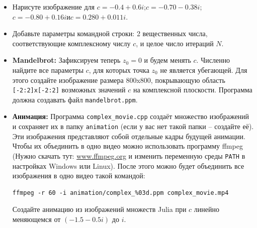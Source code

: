 \documentclass{article}
\begin{document}
\begin{itemize}
\item Нарисуте изображение для $c = -0.4 + 0.6i$;\quad $c = -0.70 - 0.38i$;\quad $c = -0.80 + 0.16i$\quad  и\quad $c = 0.280 + 0.011i$.
\item Добавьте параметры командной строки: 2 вещественных числа, соответствующие комплексному числу $c$, и целое число итераций $N$. 
\item \textbf{Mandelbrot:} Зафиксируем теперь $z_0 = 0$ и будем менять $c$. Численно найдите все параметры $c$, для которых точка $z_0$ не является убегающей. Для этого создайте изображение размера 800x800, покрывающую область \texttt{[-2:2]x[-2:2]} возможных значений $c$ на комплексной плоскости. Программа должна создавать файл \texttt{mandelbrot.ppm}.

\item \textbf{Анимация:} Программа \texttt{complex\_movie.cpp} создаёт множество изображений и сохраняет их в папку \texttt{animation} (если у вас нет такой папки -- создайте её). Эти изображения представляют собой отдельные кадры будущей анимации. Чтобы их объединить в одно видео можно использовать программу ffmpeg (Нужно скачать тут: \href{https://www.ffmpeg.org/}{www.ffmpeg.org} и изменить переменную среды \texttt{PATH} в настройках Windows или Linux). После этого можно будет объединить все изображения в одно видео такой командой:
\begin{verbatim}
ffmpeg -r 60 -i animation/complex_%03d.ppm complex_movie.mp4
\end{verbatim}
Создайте анимацию из изображений множеств Julia при $c$ линейно меняющемся от $(-1.5 - 0.5i)$ до $i$.
\end{itemize}
\end{document}
